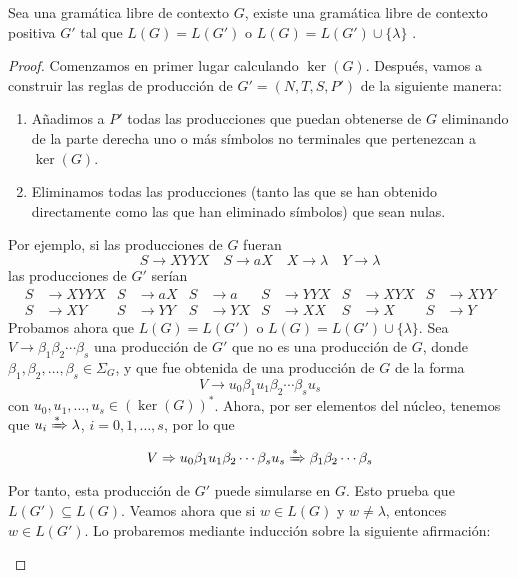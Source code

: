 \begin{lema}\label{lem:prod-lamb}Sea una gramática libre de contexto $G$, existe una gramática libre de contexto 
positiva $G'$ tal que $L(G)=L(G')$ o $L(G)=L(G')\cup\{\lambda\}$ 
\cite{davis_sigal_weyuker_1994}.
\end{lema}
\begin{proof}
Comenzamos en primer lugar calculando $\ker(G)$. Después, vamos a construir las reglas de producción de 
$G'=(N,T,S,P')$ de la siguiente manera:
\begin{enumerate}
    \item Añadimos a $P'$ todas las producciones que puedan obtenerse de $G$ eliminando de la parte derecha uno o más
    símbolos no terminales que pertenezcan a $\ker(G)$.
    \item Eliminamos todas las producciones (tanto las que se han obtenido directamente como las que han eliminado 
    símbolos) que sean nulas.
\end{enumerate}
Por ejemplo, si las producciones de $G$ fueran
\begin{equation}\label{eq:ejemplo-glc}
    S\to XYYX\quad S\to aX\quad X\to\lambda\quad Y\to\lambda
\end{equation}
las producciones de $G'$ serían
\begin{align}
    S &\to XYYX & S &\to aX & S &\to a & S &\to YYX & S &\to XYX & S &\to XYY \\
    S &\to XY & S &\to YY & S &\to YX & S &\to XX & S &\to X & S &\to Y
\end{align}
Probamos ahora que $L(G)=L(G')$ o $L(G)=L(G')\cup\{\lambda\}$. Sea $V\to\beta_1\beta_2\cdots\beta_s$ una producción de
$G'$ que no es una producción de $G$, donde $\beta_1,\beta_2,\dots,\beta_s\in\Sigma_G$, y que fue obtenida de una
producción de $G$ de la forma
\begin{equation}
    V\to u_0\beta_1u_1\beta_2\cdots\beta_su_s
\end{equation}
con $u_0,u_1,\dots,u_s\in(\ker(G))^*$. Ahora, por ser elementos del núcleo, tenemos que $u_i\xRightarrow{*}\lambda$,
$i=0,1,\dots,s$, por lo que
\begin{equation}
    V\Rightarrow u_0\beta_1u_1\beta_2\cdots\beta_su_s\xRightarrow{*}\beta_1\beta_2\cdots\beta_s
\end{equation}
Por tanto, esta producción de $G'$ puede simularse en $G$. Esto prueba que $L(G')\subseteq L(G)$. Veamos ahora que si
$w\in L(G)$ y $w\neq\lambda$, entonces $w\in L(G')$. Lo probaremos mediante inducción sobre la siguiente afirmación:
\begin{quote}

\end{quote}
\end{proof}
